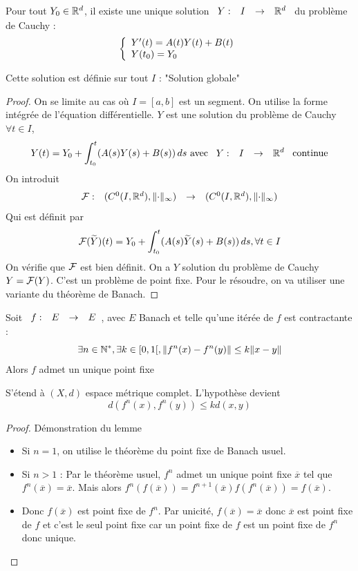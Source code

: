 \documentclass[]{report}
\begin{document}
\begin{tm}{}{}
    Pour tout $Y_0\in\mathbb{R}^d$, il existe une unique solution $\begin{array}{ccccc} Y : & I & \to & \mathbb{R}^d \end{array}$ du problème de Cauchy :
    \[\left\{\begin{array}{ll} Y'(t)=A(t)Y(t)+B(t)\\
    Y(t_0)=Y_0 \end{array} \right.\]
\end{tm}

\begin{re}{}{}
    Cette solution est définie sur tout $I$ : "Solution globale"
\end{re}

\begin{proof}{}{}
    On se limite au cas où $I=[a,b]$ est un segment. On utilise la forme intégrée de l'équation différentielle. $Y$ est une solution du problème de Cauchy \ssi $\forall t \in I$,
    \[Y(t)=Y_0+\int_{t_0}^t(A(s)Y(s)+B(s))\,ds \text{ avec $\begin{array}{ccccc} Y : & I & \to & \mathbb{R}^d \end{array}$ continue}\]
    On introduit
    \[\begin{array}{ccccc} \mathcal{F} : & (C^0(I,\mathbb{R}^d),\lVert\cdot \rVert_{\infty}) & \to & (C^0(I,\mathbb{R}^d),\lVert \cdot \rVert_{\infty}) \end{array}\]
    Qui est définit par
    \[\mathcal{F} (\widetilde{Y})(t)=Y_0+\int_{t_0}^t(A(s)\widetilde{Y}(s)+B(s))\,ds,\forall t\in I\]
    On vérifie que $\mathcal{F}$ est bien définit. On a $Y$ solution du problème de Cauchy \ssi $Y=\mathcal{F}(Y)$. C'est un problème de point fixe. Pour le résoudre, on va utiliser une variante du théorème de Banach.
\end{proof}

\begin{lm}{}{}
    Soit $\begin{array}{ccccc} f : & E & \to & E \end{array}$, avec $E$ Banach et telle qu'une itérée de $f$ est contractante :
    \[\exists n\in \mathbb{N}^*,\exists k\in[0,1[,\lVert f^{n}(x)-f^{n}(y) \rVert\le k\lVert x-y \rVert\]
    Alors $f$ admet un unique point fixe
\end{lm}

\begin{re}{}{}
    S'étend à $(X,d)$ espace métrique complet. L'hypothèse devient
    \[d(f^{n}(x),f^{n}(y))\le k d(x,y)\]
\end{re}

\begin{proof}{Démonstration du lemme}{}
    \begin{itemize}
        \item Si $n=1$, on utilise le théorème du point fixe de Banach usuel.
        \item Si $n>1$ : Par le théorème usuel, $f^{n}$ admet un unique point fixe $\overline{x}$ tel que $f^{n}(\overline{x})=\overline{x}$. Mais alors $f^{n}(f(\overline{x}))=f^{n+1}(\overline{x})f(f^n(\overline{x}))=f(\overline{x})$.\\
        \item Donc $f(\overline{x})$ est point fixe de $f^n$. Par unicité, $f(\overline{x})=\overline{x}$ donc $\overline{x}$ est point fixe de $f$ et c'est le seul point fixe car un point fixe de $f$ est un point fixe de $f^n$ donc unique.
    \end{itemize}
\end{proof}
\end{document}
